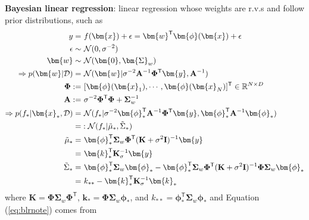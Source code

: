 \textbf{Bayesian linear regression}: linear regression whose weights are r.v.s and 
follow prior distributions, such as 
\begin{align}
    y =&~ f(\bm{x})+\epsilon = \bm{w}^\mathsf{T}\bm{\phi}(\bm{x}) + \epsilon \\
    \epsilon \sim&~ \mathcal{N}(0,\sigma^{-2}) \\
    \bm{w} \sim&~ \mathcal{N}(\bm{0},\bm{\Sigma}_w) \\
    \Rightarrow
    p(\bm{w}|\mathcal{D}) =&~ \mathcal{N}(\bm{w}|\sigma^{-2}\mathbf{A}^{-1}\mathbf{\Phi}^\mathsf{T}\bm{y},\mathbf{A}^{-1}) \\
    \mathbf{\Phi} :=&~ [\bm{\phi}(\bm{x}_1),\cdots,\bm{\phi}(\bm{x}_N)]^\mathsf{T}\in\mathbb{R}^{N\times D} \\
    \mathbf{A} :=&~ \sigma^{-2}\mathbf{\Phi}^\mathsf{T}\mathbf{\Phi} + \mathbf{\Sigma}_w^{-1} \\
    \Rightarrow 
    p(f_*|\bm{x}_*,\mathcal{D})
    =&~ \mathcal{N}(f_*|\sigma^{-2}\bm{\phi}_*^\mathsf{T}\mathbf{A}^{-1}\mathbf{\Phi}^\mathsf{T}\bm{y},\bm{\phi}_*^\mathsf{T}\mathbf{A}^{-1}\bm{\phi}_*)\\
    =&: \mathcal{N}(f_*|\Tilde{{\mu}}_*,\Tilde{{\Sigma}}_*) \\
    \Tilde{{\mu}}_*
    =&~ \bm{\phi}_*^\mathsf{T}\mathbf{\Sigma}_w\mathbf{\Phi}^\mathsf{T}(\mathbf{K}+\sigma^2\mathbf{I})^{-1}\bm{y} \label{eq:blrnote}\\
    =&~ \bm{k}_*^\mathsf{T}\mathbf{K}_\sigma^{-1}\bm{y} \\
    \Tilde{{\Sigma}}_*
    =&~ \bm{\phi}_*^\mathsf{T}\mathbf{\Sigma}_w\bm{\phi}_* - \bm{\phi}_*^\mathsf{T}\mathbf{\Sigma}_w\mathbf{\Phi}^\mathsf{T}(\mathbf{K}+\sigma^2\mathbf{I})^{-1}\mathbf{\Phi}\mathbf{\Sigma}_w\bm{\phi}_*\\
    =&~ k_{**} - \bm{k}_*^\mathsf{T}\mathbf{K}_\sigma^{-1}\bm{k}_*
\end{align}
where $\mathbf{K}=\mathbf{\Phi}\mathbf{\Sigma}_w\mathbf{\Phi}^\mathsf{T}$, $\bm{k}_*=\mathbf{\Phi}\mathbf{\Sigma}_w\bm{\phi}_*$, and ${k}_{**}=\bm{\phi}_*^\mathsf{T}\mathbf{\Sigma}_w\bm{\phi}_*$
and Equation (\ref{eq:blrnote}) comes from
